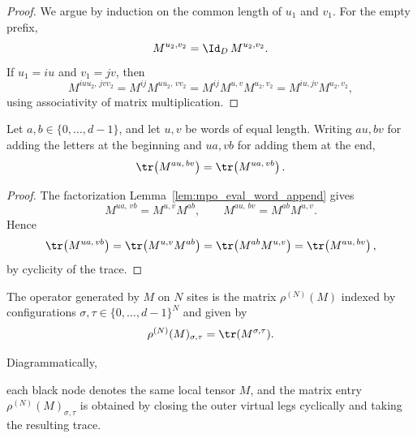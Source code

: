 \begin{proof}\leanok{}
    We argue by induction on the common length of $u_1$ and $v_1$. For the empty prefix,
    \[
        M^{u_2,v_2}=\Id_D\,M^{u_2,v_2}.
    \]
    If $u_1=iu$ and $v_1=jv$, then
    \[
        M^{iuu_2,\,jvv_2}
        = M^{ij}M^{uu_2,\,vv_2}
        = M^{ij}M^{u,v}M^{u_2,v_2}
        = M^{iu,jv}M^{u_2,v_2},
    \]
    using associativity of matrix multiplication.
\end{proof}

\begin{lemma}\label{lem:mpo_trace_evalWord_cyclic}
    \leanok
    Let $a,b\in\{0,\ldots,d{-}1\}$, and let $u,v$ be words of equal length.
    Writing $au,bv$ for adding the letters at the beginning and $ua,vb$ for
    adding them at the end,
    \[
        \tr\!\left(M^{au,\,bv}\right)
        =
        \tr\!\left(M^{ua,\,vb}\right).
    \]
\end{lemma}

\begin{proof}\leanok{}
    The factorization Lemma~\ref{lem:mpo_eval_word_append} gives
    \[
        M^{ua,\,vb}=M^{u,v}M^{ab},
        \qquad
        M^{au,\,bv}=M^{ab}M^{u,v}.
    \]
    Hence
    \[
        \tr\!\left(M^{ua,\,vb}\right)
        =\tr\!\left(M^{u,v}M^{ab}\right)
        =\tr\!\left(M^{ab}M^{u,v}\right)
        =\tr\!\left(M^{au,\,bv}\right),
    \]
    by cyclicity of the trace.
\end{proof}

\begin{definition}\label{def:mpo_family}
    \leanok
    The operator generated by $M$ on $N$ sites is the matrix
    $\rho^{(N)}(M)$ indexed by configurations
    $\sigma,\tau \in \{0,\ldots,d{-}1\}^N$ and given by
    \[
        \rho^{(N)}(M)_{\sigma,\tau} = \tr(M^{\sigma,\tau}).
    \]
\end{definition}

Diagrammatically,
\begin{center}
\end{center}
each black node denotes the same local tensor $M$, and the matrix entry
$\rho^{(N)}(M)_{\sigma,\tau}$ is obtained by closing the outer virtual
legs cyclically and taking the resulting trace.


